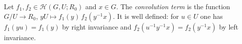 Let $f_1,f_2\in\mathcal H(G,U;R_0)$ and $x\in G$. The \emph{convolution term} is the function $G/U\to R_0$, $yU\mapsto f_1(y)\,f_2(y^{-1}x)$. It is well defined: for $u\in U$ one has $f_1(yu)=f_1(y)$ by right invariance and $f_2(u^{-1}y^{-1}x)=f_2(y^{-1}x)$ by left invariance.
